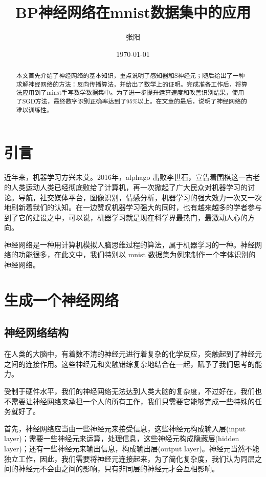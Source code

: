 \documentclass{ctexart}
\title{BP神经网络在mnist数据集中的应用}
\date{\today}
\author{张阳}
\numberwithin{equation}{section}    %
\begin{document}
\maketitle
\begin{abstract}
    本文首先介绍了神经网络的基本知识，重点说明了感知器和S神经元；随后给出了一种求解神经网络的方法：反向传播算法，并给出了数学上的证明。完成准备工作后，将算法应用到了minst手写数学数据集中。为了进一步提升运算速度和改善识别结果，使用了SGD方法，最终数字识别正确率达到了95\%以上。在文章的最后，说明了神经网络的难以训练性。
\end{abstract}
\tableofcontents
\newpage
\section{引言}
近年来，机器学习方兴未艾。2016年，alphago 击败李世石，宣告着围棋这一古老的人类运动人类已经彻底败给了计算机，再一次掀起了广大民众对机器学习的讨论。导航，社交媒体平台，图像识别，情感分析，机器学习的强大效力一次又一次地刷新着我们的认知。在一边赞叹机器学习强大的同时，也有越来越多的学者参与到了它的建设之中，可以说，机器学习就是现在科学界最热门，最激动人心的方向。

神经网络是一种用计算机模拟人脑思维过程的算法，属于机器学习的一种。神经网络的功能很多，在此文中，我们特别以 mnist 数据集为例来制作一个字体识别的神经网络。
\section{生成一个神经网络}
\subsection{神经网络结构}
在人类的大脑中，有着数不清的神经元进行着复杂的化学反应，突触起到了神经元之间的连接作用。这些神经元和突触错综复杂地结合在一起，赋予了我们思考的能力。

受制于硬件水平，我们的神经网络无法达到人类大脑的复杂度，不过好在，我们也不需要让神经网络来承担一个人的所有工作，我们只需要它能够完成一些特殊的任务就好了。

首先，神经网络应当由一些神经元来接受信息，这些神经元构成输入层(input layer)；需要一些神经元来运算，处理信息，这些神经元构成隐藏层(hidden layer)；还有一些神经元来输出信息，构成输出层(output layer)。神经元当然不能独立工作，因此，我们需要将神经元连接起来，为了简化复杂度，我们认为同层之间的神经元不会由之间的影响，只有非同层的神经元才会互相影响。
\end{document}
